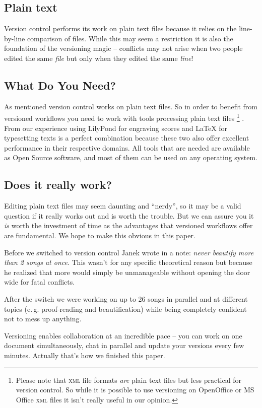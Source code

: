 \documentclass[11pt,a4paper]{article}
\begin{document}
\subsection{Plain text}
Version control performs its work on plain text files because it relies on the 
line-by-line comparison of files. While this may seem a restriction it is also the
foundation of the versioning magic -- conflicts may not arise when two people edited the
same \emph{file} but only when they edited the same \emph{line}!

\subsection{What Do You Need?}
As mentioned version control works on plain text files. So in order to benefit from versioned
workflows you need to work with tools processing plain text files%
\footnote{Please note that \textsc{xml} file formats \emph{are} plain text files
but less practical for version control. So while it is possible to use versioning on
OpenOffice or MS Office \textsc{xml} files it isn't really useful in our opinion.}
. From our experience
using LilyPond for engraving scores and \LaTeX{} for typesetting texts is a perfect
combination because these two also offer excellent performance in their respective domains.
All tools that are needed are available as Open Source software, and most of them can
be used on any operating system.

\subsection{Does it really work?}
Editing plain text files may seem daunting and “nerdy”, so it may be a valid question
if it really works out and is worth the trouble. But we can assure you it \emph{is} worth
the investment of time as the advantages that versioned workflows offer are fundamental.
We hope to make this obvious in this paper.

Before we switched to version control Janek wrote in a note: \emph{never beautify more than 2
songs at once}. This wasn't for any specific theoretical reason but because he realized
that more would simply be unmanageable without opening the door wide for fatal
conflicts.

After the switch we were working on up to 26 songs in parallel and at different topics
(e.\,g. proof-reading and beautification) while being completely confident not to
mess up anything.

Versioning enables collaboration at an incredible pace -- you can work on one document
simultaneously, chat in parallel and update your versions every
few minutes. Actually that's how we finished this paper.
\end{document}

